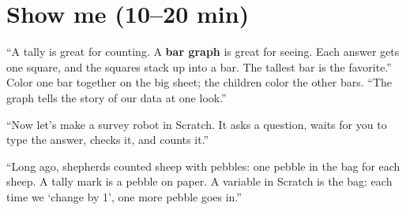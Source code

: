 \section{Show me (10--20 min)}
\begin{teacherscript}
\enquote{A tally is great for counting. A \textbf{bar graph} is great for seeing. Each answer gets one square, and the squares stack up into a bar. The tallest bar is the favorite.} Color one bar together on the big sheet; the children color the other bars. \enquote{The graph tells the story of our data at one look.}

\enquote{Now let's make a survey robot in Scratch. It asks a question, waits for you to type the answer, checks it, and counts it.}
\end{teacherscript}

\begin{analogy}
\enquote{Long ago, shepherds counted sheep with pebbles: one pebble in the bag for each sheep. A tally mark is a pebble on paper. A variable in Scratch is the bag: each time we \enquote{change by 1}, one more pebble goes in.}
\end{analogy}

